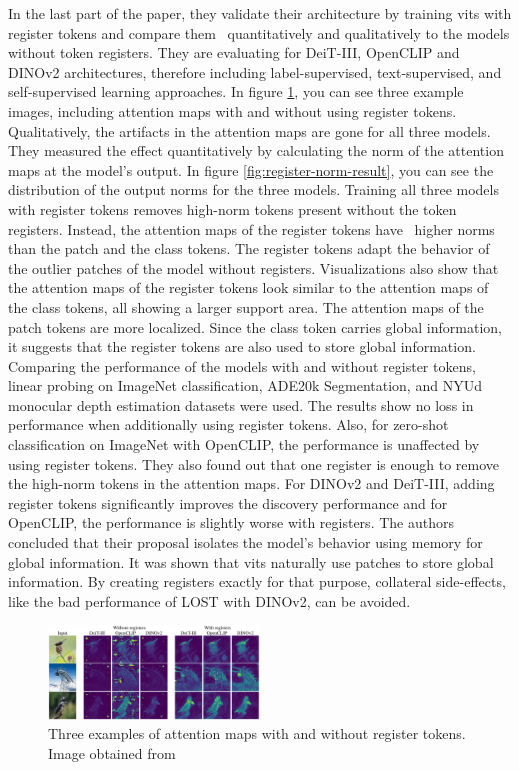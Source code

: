 \documentclass[conference]{IEEEtran}
\begin{document}
  In the last part of the paper, they validate their architecture by training \acp{vit} with register tokens and compare them  quantitatively and qualitatively to the models without token registers. They are evaluating for \mbox{DeiT-III}, \mbox{OpenCLIP} and \mbox{DINOv2} architectures, therefore including label-supervised, text-supervised, and self-supervised learning approaches. In figure \ref{fig:register-result}, you can see three example images, including attention maps with and without using register tokens. Qualitatively, the artifacts in the attention maps are gone for all three models. They measured the effect quantitatively by calculating the norm of the attention maps at the model's output. In figure \ref{fig:register-norm-result}, you can see the distribution of the output norms for the three models. Training all three models with register tokens removes high-norm tokens present without the token registers. Instead, the attention maps of the register tokens have  higher norms than the patch and the class tokens. The register tokens adapt the behavior of the outlier patches of the model without registers. Visualizations also show that the attention maps of the register tokens look similar to the attention maps of the class tokens, all showing a larger support area. The attention maps of the patch tokens are more localized. Since the class token carries global information, it suggests that the register tokens are also used to store global information. Comparing the performance of the models with and without register tokens, linear probing on ImageNet classification, ADE20k Segmentation, and NYUd monocular depth estimation datasets were used. The results show no loss in performance when additionally using register tokens. Also, for zero-shot classification on ImageNet with \mbox{OpenCLIP}, the performance is unaffected by using register tokens. They also found out that one register is enough to remove the high-norm tokens in the attention maps. For \mbox{DINOv2} and \mbox{DeiT-III}, adding register tokens significantly improves the discovery performance and for \mbox{OpenCLIP}, the performance is slightly worse with registers. The authors concluded that their proposal isolates the model's behavior using memory for global information. It was shown that \acp{vit} naturally use patches to store global information. By creating registers exactly for that purpose, collateral side-effects, like the bad performance of \mbox{LOST} with \mbox{DINOv2}, can be avoided.

  \begin{figure}
    \centering
    \includegraphics[width=0.5\textwidth]{figures/register-result.png}
    \caption{Three examples of attention maps with and without register tokens. Image obtained from \cite{registers}}
    \label{fig:register-result}
  \end{figure}
\end{document}
